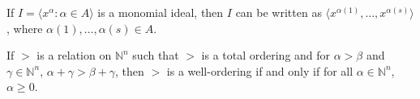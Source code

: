 \documentclass[crop=false,class=article,oneside]{standalone}
\begin{document}
            \begin{theorem}
                If $I=\langle{x}^{\alpha}:\alpha\in{A}\rangle$
                is a monomial ideal, then $I$ can be written as
                $\langle{x}^{\alpha(1)},\hdots,x^{\alpha(s)}\rangle$,
                where $\alpha(1),\hdots,\alpha(s)\in{A}$. 
            \end{theorem}
            \begin{theorem}
                If $>$ is a relation on $\mathbb{N}^n$
                such that $>$ is a total ordering and for
                $\alpha>\beta$ and $\gamma\in\mathbb{N}^n$,
                $\alpha+\gamma>\beta+\gamma$, then $>$ is a
                well-ordering if and only if for all
                $\alpha\in\mathbb{N}^n$, $\alpha\geq{0}$.
            \end{theorem}
\end{document}
